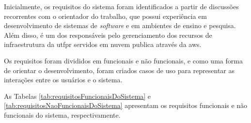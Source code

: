 
Inicialmente, os requisitos do sistema foram identificados a partir de discussões recorrentes com o orientador do trabalho, que possui experiência em desenvolvimento de sistemas de \textit{software} e em ambientes de ensino e pesquisa. Além disso, é um dos responsáveis pelo gerenciamento dos recursos de infraestrutura da \gls{utfpr} servidos em nuvem publica através da \gls{aws}.

Os requisitos foram divididos em funcionais e não funcionais, e como uma forma de orientar o desenvolvimento, foram criados casos de uso para representar as interações entre os usuários e o sistema.

As Tabelas \ref{tab:requisitosFuncionaisDoSistema} e \ref{tab:requisitosNaoFuncionaisDoSistema} apresentam os requisitos funcionais e não funcionais do sistema, respectivamente.

